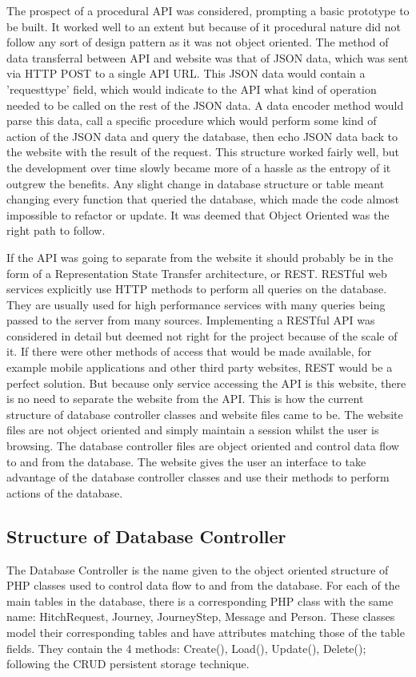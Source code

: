 		The prospect of a procedural API was considered, prompting a basic prototype to be built. It worked well to an extent but because of it procedural nature did not follow any sort of design pattern as it was not object oriented. The method of data transferral between API and website was that of JSON data, which was sent via HTTP POST to a single API URL. This JSON data would contain a 'request\textunderscore type' field, which would indicate to the API what kind of operation needed to be called on the rest of the JSON data. A data encoder method would parse this data, call a specific procedure which would perform some kind of action of the JSON data and query the database, then echo JSON data back to the website with the result of the request. This structure worked fairly well, but the development over time slowly became more of a hassle as the entropy of it outgrew the benefits. Any slight change in database structure or table meant changing every function that queried the database, which made the code almost impossible to refactor or update. It was deemed that Object Oriented was the right path to follow. 
		
		If the API was going to separate from the website it should probably be in the form of a Representation State Transfer architecture, or REST. RESTful web services explicitly use HTTP methods to perform all queries on the database. They are usually used for high performance services with many queries being passed to the server from many sources. Implementing a RESTful API was considered in detail but deemed not right for the project because of the scale of it. If there were other methods of access that would be made available, for example mobile applications and other third party websites, REST would be a perfect solution. But because only service accessing the API is this website, there is no need to separate the website from the API. This is how the current structure of database controller classes and website files came to be. The website files are not object oriented and simply maintain a session whilst the user is browsing. The database controller files are object oriented and control data flow to and from the database. The website gives the user an interface to take advantage of the database controller classes and use their methods to perform actions of the database.
		
	\subsection{Structure of Database Controller}
		The Database Controller is the name given to the object oriented structure of PHP classes used to control data flow to and from the database. For each of the main tables in the database, there is a corresponding PHP class with the same name: Hitch\textunderscore Request, Journey, Journey\textunderscore Step, Message and Person. These classes model their corresponding tables and have attributes matching those of the table fields. They contain the 4 methods: Create(), Load(), Update(), Delete(); following the CRUD persistent storage technique\cite{crud_technique}. 

